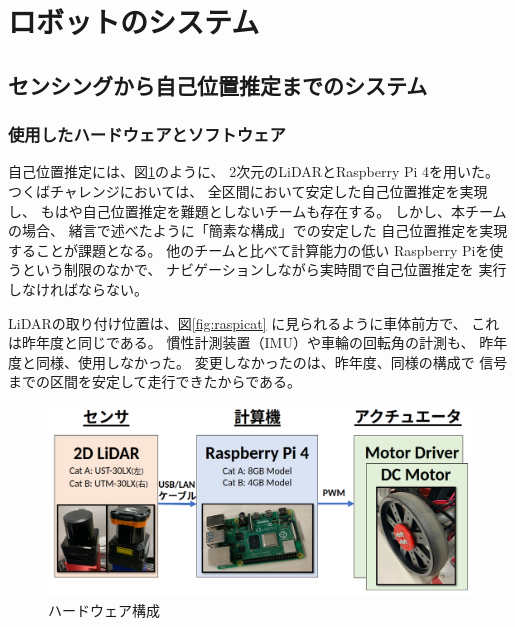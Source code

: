 \documentclass[twocolumn,9pt]{jsproceedings}
\begin{document}
\section{ロボットのシステム}

\subsection{センシングから自己位置推定までのシステム}\label{sub:localization}

\subsubsection{使用したハードウェアとソフトウェア}


自己位置推定には、図\ref{fig:hardware}のように、
2次元のLiDARとRaspberry Pi 4を用いた。
つくばチャレンジにおいては、
全区間において安定した自己位置推定を実現し、
もはや自己位置推定を難題としないチームも存在する。
しかし、本チームの場合、
緒言で述べたように「簡素な構成」での安定した
自己位置推定を実現することが課題となる。
他のチームと比べて計算能力の低い
Raspberry Piを使うという制限のなかで、
ナビゲーションしながら実時間で自己位置推定を
実行しなければならない。


LiDARの取り付け位置は、図\ref{fig:raspicat}
に見られるように車体前方で、
これは昨年度\cite{池邉2021}と同じである。
慣性計測装置（IMU）や車輪の回転角の計測も、
昨年度と同様、使用しなかった。
変更しなかったのは、昨年度、同様の構成で
信号までの区間を安定して走行できたからである。

\begin{figure}[h]
  \begin{center}
    \includegraphics[width=1.0\linewidth]{figs/hardware.pdf}
    \caption{ハードウェア構成}
    \label{fig:hardware}
  \end{center}
\end{figure}
\end{document}
